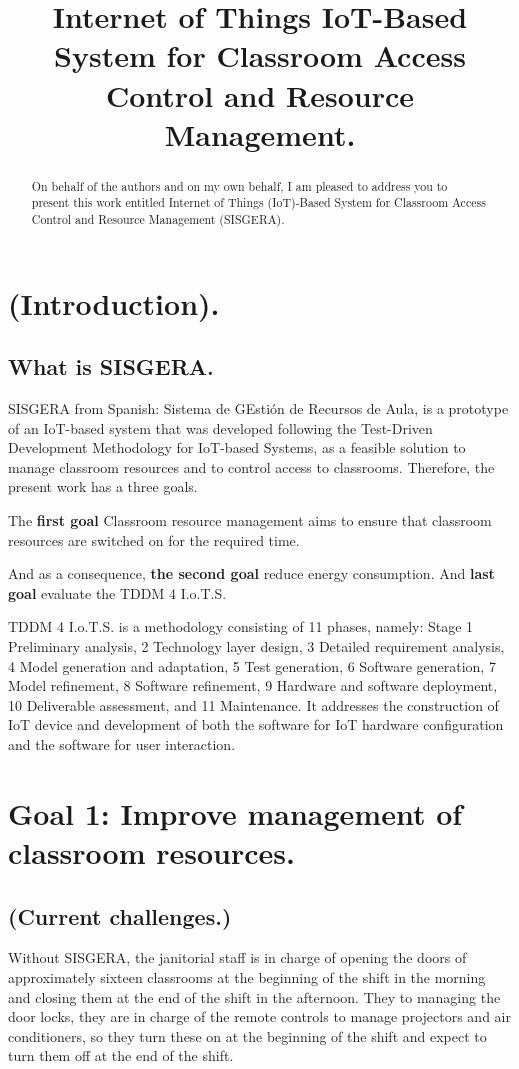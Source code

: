 \documentclass[]{scrartcl}
\title{Internet of Things IoT-Based System for Classroom Access Control and Resource Management.}
\begin{document}
\maketitle

\begin{abstract}
On behalf of the authors and on my own behalf, I am pleased to address you to present this work entitled Internet of Things (IoT)-Based System for Classroom Access Control and Resource Management (SISGERA).
\end{abstract}

\section*{(Introduction).}
	
	\subsection*{What is SISGERA.}
	SISGERA from Spanish: Sistema de GEstión de Recursos de Aula, is a prototype of an IoT-based system that was developed following the Test-Driven Development Methodology for IoT-based Systems, as a feasible solution to manage classroom resources and to control access to classrooms. Therefore, the present work has a three goals.
	
	The \textbf{first goal} Classroom resource management aims to ensure that classroom resources are switched on for the required time.
	
	And as a consequence, \textbf{the second goal} reduce energy consumption. And \textbf{last goal} evaluate the TDDM 4 I.o.T.S.
	
	TDDM 4 I.o.T.S. is a methodology consisting of 11 phases, namely: Stage 1 Preliminary analysis, 2 Technology layer design, 3 Detailed requirement analysis, 4 Model generation and adaptation, 5 Test generation, 6 Software generation, 7 Model refinement, 8 Software refinement, 9 Hardware and software deployment, 10 Deliverable assessment, and 11 Maintenance. It addresses the construction of IoT device and development of both the software for IoT hardware configuration and the software for user interaction.
\section*{Goal 1: Improve management of classroom resources.}
	\subsection*{(Current challenges.)}
	Without SISGERA, the janitorial staff is in charge of opening the doors of approximately sixteen classrooms at the beginning of the shift in the morning and closing them at the end of the shift in the afternoon. They to managing the door locks, they are in charge of the remote controls to manage projectors and air conditioners, so they turn these on at the beginning of the shift and expect to turn them off at the end of the shift.
	
\end{document}
